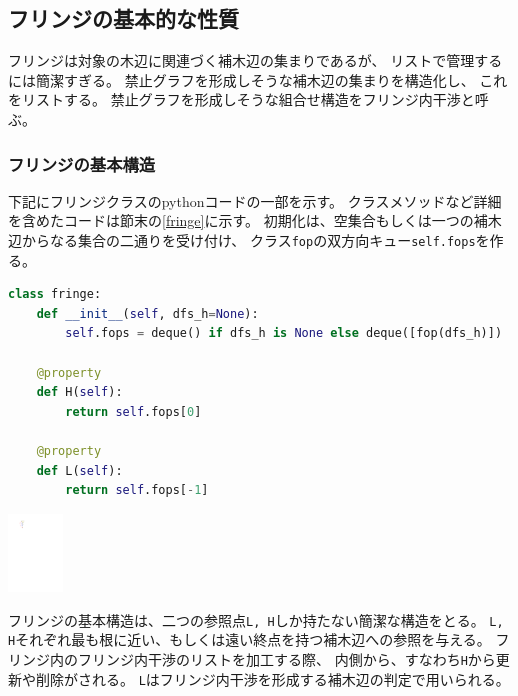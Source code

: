 \subsection{フリンジの基本的な性質}

フリンジは対象の木辺に関連づく補木辺の集まりであるが、
リストで管理するには簡潔すぎる。
禁止グラフを形成しそうな補木辺の集まりを構造化し、
これをリストする。
禁止グラフを形成しそうな組合せ構造をフリンジ内干渉と呼ぶ。

\subsubsection{フリンジの基本構造}

下記にフリンジクラスのpythonコードの一部を示す。
クラスメソッドなど詳細を含めたコードは節末の\lstrefname\ref{fringe}に示す。
初期化は、空集合もしくは一つの補木辺からなる集合の二通りを受け付け、
クラス{\tt fop}の双方向キュー{\tt self.fops}を作る。

\vspace{-1.\intextsep}
\begin{paracol}{2}
\begin{lstlisting}[language=Python]
class fringe:
    def __init__(self, dfs_h=None):
        self.fops = deque() if dfs_h is None else deque([fop(dfs_h)])

    @property
    def H(self):
        return self.fops[0]

    @property
    def L(self):
        return self.fops[-1]
\end{lstlisting}

\switchcolumn
\vspace*{2.\intextsep}
\centering
\includegraphics[width=0.11\textwidth]{figures/fringe_basic_code.pdf}
\end{paracol}

フリンジの基本構造は、二つの参照点{\tt L, H}しか持たない簡潔な構造をとる。
{\tt L, H}それぞれ最も根に近い、もしくは遠い終点を持つ補木辺への参照を与える。
フリンジ内のフリンジ内干渉のリストを加工する際、
内側から、すなわち{\tt H}から更新や削除がされる。
{\tt L}はフリンジ内干渉を形成する補木辺の判定で用いられる。







